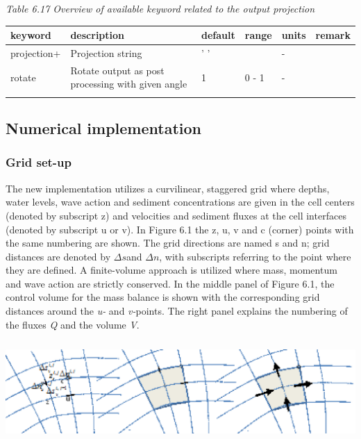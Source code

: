 \documentclass{article}
\begin{document}
\noindent 

\noindent \textit{Table 6.17 Overview of available keyword related to the output projection}

\begin{tabular}{|p{0.8in}|p{1.0in}|p{0.6in}|p{0.7in}|p{0.4in}|p{0.6in}|} \hline 
keyword & description & default & range & units & remark \\ \hline 
projection+ & Projection string & ' ' &  & - &  \\ \hline 
rotate & Rotate output as post processing with given angle & 1 & 0 - 1 & - &  \\ \hline 
 &  &  &  &  &  \\ \hline 
\end{tabular}



\noindent \eject \textbf{}


\subsection{ Numerical implementation }


\subsubsection{ Grid set-up}

\noindent The new implementation utilizes a curvilinear, staggered grid where depths, water levels, wave action and sediment concentrations are given in the cell centers (denoted by subscript z) and velocities and sediment fluxes at the cell interfaces (denoted by subscript u or v). In Figure 6.1 the z, u, v and c (corner) points with the same numbering are shown. The grid directions are named s and n; grid distances are denoted by $\Delta s$and $\Delta n$, with subscripts referring to the point where they are defined. A finite-volume approach is utilized where mass, momentum and wave action are strictly conserved.  In the  middle panel of Figure 6.1, the control volume for the mass balance is shown with the corresponding grid distances around the \textit{u-} and \textit{v-}points. The right panel explains the numbering of the fluxes \textit{Q }and the volume \textit{V}.

\noindent \includegraphics*[width=6.65in, height=1.51in, keepaspectratio=false]{image28}
\end{document}
